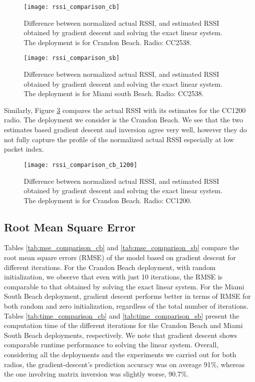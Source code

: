 \begin{figure}
    \centering    \texttt{[image: rssi\_comparison\_cb]}
    \caption{Difference between normalized actual RSSI, and estimated RSSI obtained by gradient descent and solving the exact linear system. The deployment is for Crandon Beach. Radio: CC2538.}
    \label{fig:rssi_comparison_cb}
\end{figure}

\begin{figure}
    \centering    \texttt{[image: rssi\_comparison\_sb]}
    \caption{Difference between normalized actual RSSI, and estimated RSSI obtained by gradient descent and solving the exact linear system. The deployment is for Miami south Beach. Radio: CC2538.}
    \label{fig:rssi_comparison_sb}
\end{figure}

Similarly, Figure \ref{fig:estimation_mmse_cc1200_crando} compares the actual RSSI with its estimates for the CC1200 radio. The deployment we consider is the Crandon Beach. We see that the two estimates based gradient descent and inversion agree very well, however they do not fully capture the profile of the normalized actual RSSI especially at low packet index.

\begin{figure}[tbh!]
	\centering
        \texttt{[image: rssi\_comparison\_cb\_1200]}
	\caption{Difference between normalized actual RSSI, and estimated RSSI obtained by gradient descent and solving the exact linear system. The deployment is for Crandon Beach. Radio: CC1200.}
	\label{fig:estimation_mmse_cc1200_crando}
\end{figure}

\subsection{Root Mean Square Error}
Tables \ref{tab:mse_comparison_cb} and \ref{tab:mse_comparison_sb} compare the root mean square errors (RMSE) of the model based on gradient descent for different iterations. For the Crandon Beach deployment, with random initialization, we observe that even with just 10 iterations, the RMSE is comparable to that obtained by solving the exact linear system. For the Miami South Beach deployment, gradient descent performs better in terms of RMSE for both random and zero initialization, regardless of the total number of iterations. Tables \ref{tab:time_comparison_cb} and \ref{tab:time_comparison_sb} present the computation time of the different iterations for the Crandon Beach and Miami South Beach deployments, respectively. We note that gradient descent shows comparable runtime performance to solving the linear system. Overall, considering all the deployments and the experiments we carried out for both radios, the gradient-descent's prediction accuracy was on average 91\%, whereas the one involving matrix inversion was slightly worse, 90.7\%.

